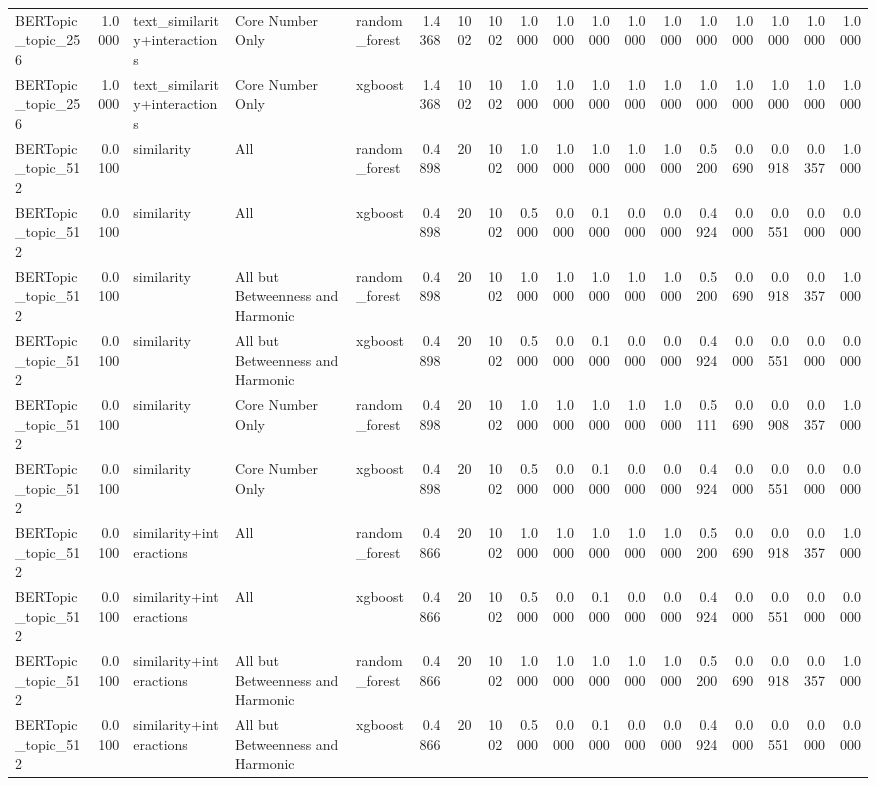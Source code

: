 \begin{tabular}{lrlllrrrrrrrrrrrrr}
BERTopic_topic_256 & 1.0000 & text_similarity+interactions & Core Number Only & random_forest & 1.4368 & 1002 & 1002 & 1.0000 & 1.0000 & 1.0000 & 1.0000 & 1.0000 & 1.0000 & 1.0000 & 1.0000 & 1.0000 & 1.0000 \\
BERTopic_topic_256 & 1.0000 & text_similarity+interactions & Core Number Only & xgboost & 1.4368 & 1002 & 1002 & 1.0000 & 1.0000 & 1.0000 & 1.0000 & 1.0000 & 1.0000 & 1.0000 & 1.0000 & 1.0000 & 1.0000 \\
BERTopic_topic_512 & 0.0100 & similarity & All & random_forest & 0.4898 & 20 & 1002 & 1.0000 & 1.0000 & 1.0000 & 1.0000 & 1.0000 & 0.5200 & 0.0690 & 0.0918 & 0.0357 & 1.0000 \\
BERTopic_topic_512 & 0.0100 & similarity & All & xgboost & 0.4898 & 20 & 1002 & 0.5000 & 0.0000 & 0.1000 & 0.0000 & 0.0000 & 0.4924 & 0.0000 & 0.0551 & 0.0000 & 0.0000 \\
BERTopic_topic_512 & 0.0100 & similarity & All but Betweenness and Harmonic & random_forest & 0.4898 & 20 & 1002 & 1.0000 & 1.0000 & 1.0000 & 1.0000 & 1.0000 & 0.5200 & 0.0690 & 0.0918 & 0.0357 & 1.0000 \\
BERTopic_topic_512 & 0.0100 & similarity & All but Betweenness and Harmonic & xgboost & 0.4898 & 20 & 1002 & 0.5000 & 0.0000 & 0.1000 & 0.0000 & 0.0000 & 0.4924 & 0.0000 & 0.0551 & 0.0000 & 0.0000 \\
BERTopic_topic_512 & 0.0100 & similarity & Core Number Only & random_forest & 0.4898 & 20 & 1002 & 1.0000 & 1.0000 & 1.0000 & 1.0000 & 1.0000 & 0.5111 & 0.0690 & 0.0908 & 0.0357 & 1.0000 \\
BERTopic_topic_512 & 0.0100 & similarity & Core Number Only & xgboost & 0.4898 & 20 & 1002 & 0.5000 & 0.0000 & 0.1000 & 0.0000 & 0.0000 & 0.4924 & 0.0000 & 0.0551 & 0.0000 & 0.0000 \\
BERTopic_topic_512 & 0.0100 & similarity+interactions & All & random_forest & 0.4866 & 20 & 1002 & 1.0000 & 1.0000 & 1.0000 & 1.0000 & 1.0000 & 0.5200 & 0.0690 & 0.0918 & 0.0357 & 1.0000 \\
BERTopic_topic_512 & 0.0100 & similarity+interactions & All & xgboost & 0.4866 & 20 & 1002 & 0.5000 & 0.0000 & 0.1000 & 0.0000 & 0.0000 & 0.4924 & 0.0000 & 0.0551 & 0.0000 & 0.0000 \\
BERTopic_topic_512 & 0.0100 & similarity+interactions & All but Betweenness and Harmonic & random_forest & 0.4866 & 20 & 1002 & 1.0000 & 1.0000 & 1.0000 & 1.0000 & 1.0000 & 0.5200 & 0.0690 & 0.0918 & 0.0357 & 1.0000 \\
BERTopic_topic_512 & 0.0100 & similarity+interactions & All but Betweenness and Harmonic & xgboost & 0.4866 & 20 & 1002 & 0.5000 & 0.0000 & 0.1000 & 0.0000 & 0.0000 & 0.4924 & 0.0000 & 0.0551 & 0.0000 & 0.0000 \\

\end{tabular}
